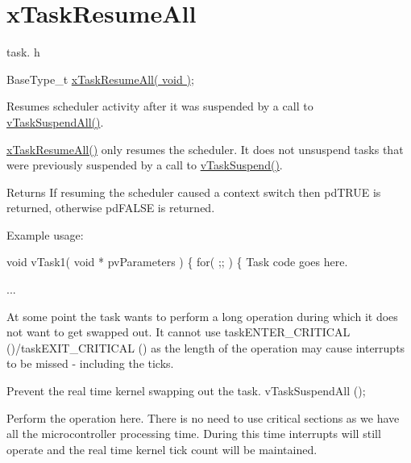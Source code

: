\hypertarget{group__xTaskResumeAll}{\section{x\-Task\-Resume\-All}
\label{group__xTaskResumeAll}
}
task. h 
\begin{DoxyPre}BaseType\_t \hyperlink{task_8h_a003f8ae6d649225abd030cc76e1c7d0e}{xTaskResumeAll( void )};\end{DoxyPre}


Resumes scheduler activity after it was suspended by a call to \hyperlink{task_8h_a366b302eba79d10b5ee2a3756f0fcc43}{v\-Task\-Suspend\-All()}.

\hyperlink{task_8h_a003f8ae6d649225abd030cc76e1c7d0e}{x\-Task\-Resume\-All()} only resumes the scheduler. It does not unsuspend tasks that were previously suspended by a call to \hyperlink{task_8h_a84d4e660b04630be2939d91b3c2412f8}{v\-Task\-Suspend()}.

\begin{DoxyReturn}{Returns}
If resuming the scheduler caused a context switch then pd\-T\-R\-U\-E is returned, otherwise pd\-F\-A\-L\-S\-E is returned.
\end{DoxyReturn}
Example usage\-: 
\begin{DoxyPre}
 void vTask1( void * pvParameters )
 \{
     for( ;; )
     \{
Task code goes here.\end{DoxyPre}



\begin{DoxyPre}...\end{DoxyPre}



\begin{DoxyPre}At some point the task wants to perform a long operation during
which it does not want to get swapped out.  It cannot use
taskENTER\_CRITICAL ()/taskEXIT\_CRITICAL () as the length of the
operation may cause interrupts to be missed - including the
ticks.\end{DoxyPre}



\begin{DoxyPre}Prevent the real time kernel swapping out the task.
         vTaskSuspendAll ();\end{DoxyPre}



\begin{DoxyPre}Perform the operation here.  There is no need to use critical
sections as we have all the microcontroller processing time.
During this time interrupts will still operate and the real
time kernel tick count will be maintained.\end{DoxyPre}



